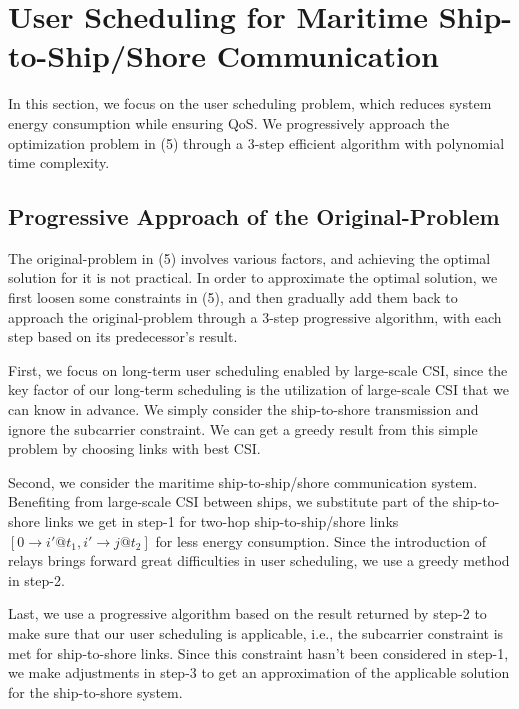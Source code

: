 \documentclass[conference]{IEEEtran}
\begin{document}
 \section{User Scheduling for Maritime Ship-to-Ship/Shore Communication}\label{sec:3}
 
 In this section, we focus on the user scheduling problem, which reduces system energy consumption while ensuring QoS. We progressively approach the optimization problem in (5) through a 3-step efficient algorithm with polynomial time complexity.
 
 
 \subsection{Progressive Approach of the Original-Problem}
 
 The original-problem in (5) involves various factors, and achieving the optimal solution for it is not practical. 
 In order to approximate the optimal solution, we first loosen some constraints in (5), and then gradually add them back to approach the original-problem through a 3-step progressive algorithm, with each step based on its predecessor's result. 
 
 First, we focus on long-term user scheduling enabled by large-scale CSI, since the key factor of our long-term scheduling is the utilization of large-scale CSI that we can know in advance. We simply consider the ship-to-shore transmission and ignore the subcarrier constraint. We can get a greedy result from this simple problem by choosing links with best CSI. 
 
 Second, we consider the maritime ship-to-ship/shore communication system. Benefiting from large-scale CSI between ships, we substitute part of the ship-to-shore links we get in step-1 for two-hop ship-to-ship/shore links $\left[ {0 \to i'@{t_1},i' \to j@{t_2}} \right]$ for less energy consumption. Since the introduction of relays brings forward great difficulties in user scheduling, we use a greedy method in step-2. 
 
 Last, we use a progressive algorithm based on the result returned by step-2 to make sure that our user scheduling is applicable, i.e., the subcarrier constraint is met for ship-to-shore links. Since this constraint hasn't been considered in step-1, we make adjustments in step-3 to get an approximation of the applicable solution for the ship-to-shore system. 
\end{document}
